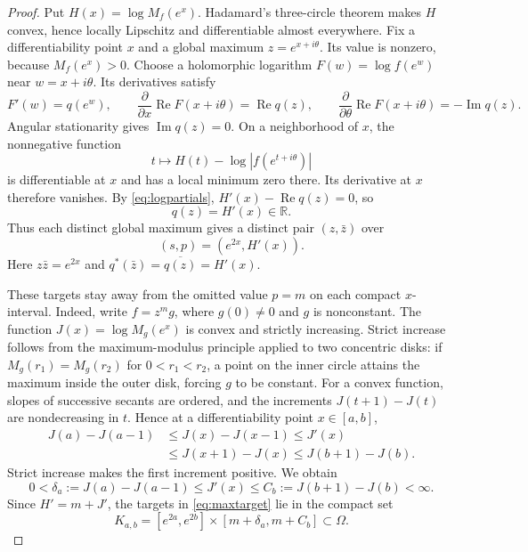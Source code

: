 \documentclass[11pt,reqno]{amsart}
\theoremstyle{remark}
\numberwithin{equation}{section}
\newcommand{\R}{\mathbb R}
\DeclareMathOperator{\Rea}{Re}
\DeclareMathOperator{\Ima}{Im}
\begin{document}
\begin{proof}
Put $H(x)=\log M_f(e^x)$. Hadamard's three-circle theorem makes $H$
convex, hence locally Lipschitz and differentiable almost everywhere.
Fix a differentiability point $x$ and a global maximum
$z=e^{x+i\theta}$. Its value is nonzero, because $M_f(e^x)>0$.
Choose a holomorphic logarithm
$F(w)=\log f(e^w)$ near $w=x+i\theta$. Its derivatives satisfy
\begin{equation}\label{eq:logpartials}
 F'(w)=q(e^w),\qquad
 \frac{\partial}{\partial x}\Rea F(x+i\theta)=\Rea q(z),
 \qquad
 \frac{\partial}{\partial\theta}\Rea F(x+i\theta)=-\Ima q(z).
\end{equation}
Angular stationarity gives $\Ima q(z)=0$. On a neighborhood of $x$,
the nonnegative function
\[
 t\longmapsto H(t)-\log|f(e^{t+i\theta})|
\]
is differentiable at $x$ and has a local minimum zero there.
Its derivative at $x$ therefore vanishes. By
\eqref{eq:logpartials}, $H'(x)-\Rea q(z)=0$, so
\begin{equation}\label{eq:slope}
 q(z)=H'(x)\in\R.
\end{equation}
Thus each distinct global maximum gives a distinct pair $(z,\bar z)$
over
\begin{equation}\label{eq:maxtarget}
 (s,p)=(e^{2x},H'(x)).
\end{equation}
Here $z\bar z=e^{2x}$ and
$q^*(\bar z)=\overline{q(z)}=H'(x)$.

These targets stay away from the omitted value $p=m$ on each compact
$x$-interval. Indeed, write $f=z^m g$, where $g(0)\ne0$ and $g$ is
nonconstant. The function $J(x)=\log M_g(e^x)$ is convex and strictly
increasing. Strict increase follows from the maximum-modulus
principle applied to two concentric disks: if $M_g(r_1)=M_g(r_2)$
for $0<r_1<r_2$, a point on the inner circle attains the maximum
inside the outer disk, forcing $g$ to be constant. For a convex
function, slopes of successive secants are ordered, and the
increments $J(t+1)-J(t)$ are nondecreasing in $t$. Hence at a
differentiability point $x\in[a,b]$,
\[
 \begin{split}
 J(a)-J(a-1)
 &\le J(x)-J(x-1)\le J'(x)\\
 &\le J(x+1)-J(x)\le J(b+1)-J(b).
 \end{split}
\]
Strict increase makes the first increment positive. We obtain
\begin{equation}\label{eq:slopebounds}
 0<\delta_a:=J(a)-J(a-1)\le J'(x)
 \le C_b:=J(b+1)-J(b)<\infty.
\end{equation}
Since $H'=m+J'$, the targets in \eqref{eq:maxtarget} lie in the compact set
\[
 K_{a,b}=[e^{2a},e^{2b}]\times[m+\delta_a,m+C_b]\subset\Omega.
\]


\end{proof}
\end{document}
